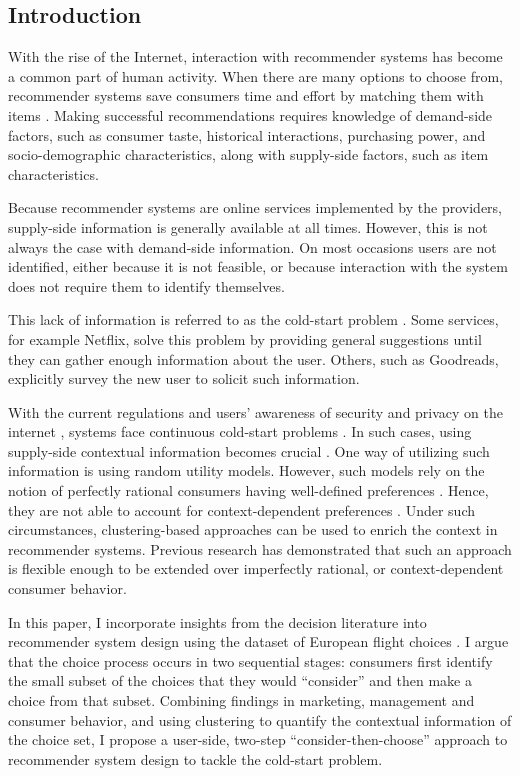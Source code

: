 \documentclass[a4paper,12pt]{article}
\begin{document}
\subsection{Introduction}

With the rise of the Internet, interaction with recommender systems has become a common part of human activity. When there are many options to choose from, recommender systems save consumers time and effort by matching them with items \citep{bobadilla2013recommender}. Making successful recommendations requires knowledge of demand-side factors, such as consumer taste, historical interactions, purchasing power, and socio-demographic characteristics, along with supply-side factors, such as item characteristics.

Because recommender systems are online services implemented by the providers, supply-side information is generally available at all times. However, this is not always the case with demand-side information. On most occasions users are not identified, either because it is not feasible, or because interaction with the system does not require them to identify themselves.

This lack of information is referred to as the cold-start problem \citep{adomavicius2005toward}. Some services, for example Netflix, solve this problem by providing general suggestions until they can gather enough information about the user. Others, such as Goodreads, explicitly survey the new user to solicit such information.

With the current regulations and users' awareness of security and privacy on the internet \citep{anton2010internet}, systems face continuous cold-start problems \citep{wong2014online}. In such cases, using supply-side contextual information becomes crucial \citep{adomavicius2005toward}. One way of utilizing such information is using random utility models. However, such models rely on the notion of perfectly rational consumers having well-defined preferences \citep{babutsidze2019asymmetric}. Hence, they are not able to account for context-dependent preferences \citep{tversky1979preference}. Under such circumstances, clustering-based approaches can be used to enrich the context in recommender systems. Previous research \citep{babutsidze2019asymmetric} has demonstrated that such an approach is flexible enough to be extended over imperfectly rational, or context-dependent consumer behavior.

In this paper, I incorporate insights from the decision literature into recommender system design using the dataset of European flight choices \citep{lheritier2019airline}. I argue that the choice process occurs in two sequential stages: consumers first identify the small subset of the choices that they would ``consider'' and then make a choice from that subset. Combining findings in marketing, management and consumer behavior, and using clustering to quantify the contextual information of the choice set,  I propose a user-side, two-step  ``consider-then-choose'' \citep{gilbride2004choice,liu2011efficient} approach to recommender system design to tackle the cold-start problem. 
\end{document}
